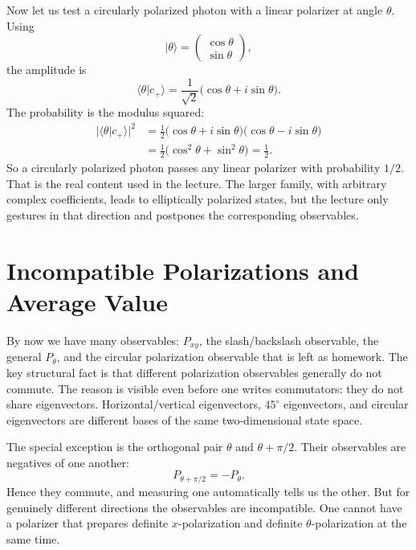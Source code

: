 Now let us test a circularly polarized photon with a linear polarizer at angle \(\theta\). Using
\begin{equation}
|\theta\rangle=
\begin{pmatrix}
\cos\theta\\
\sin\theta
\end{pmatrix},
\end{equation}
the amplitude is
\begin{equation}
\langle \theta|c_+\rangle
=
\frac{1}{\sqrt2}\bigl(\cos\theta+i\sin\theta\bigr).
\end{equation}
The probability is the modulus squared:
\begin{align}
|\langle \theta|c_+\rangle|^2
&=
\frac12\bigl(\cos\theta+i\sin\theta\bigr)\bigl(\cos\theta-i\sin\theta\bigr) \\
&=
\frac12\bigl(\cos^2\theta+\sin^2\theta\bigr)
=
\frac12.
\end{align}
So a circularly polarized photon passes any linear polarizer with probability \(1/2\). That is the real content used in the lecture. The larger family, with arbitrary complex coefficients, leads to elliptically polarized states, but the lecture only gestures in that direction and postpones the corresponding observables.

\section{Incompatible Polarizations and Average Value}

By now we have many observables: \(P_{xy}\), the slash/backslash observable, the general \(P_\theta\), and the circular polarization observable that is left as homework. The key structural fact is that different polarization observables generally do not commute. The reason is visible even before one writes commutators: they do not share eigenvectors. Horizontal/vertical eigenvectors, \(45^\circ\) eigenvectors, and circular eigenvectors are different bases of the same two-dimensional state space.

The special exception is the orthogonal pair \(\theta\) and \(\theta+\pi/2\). Their observables are negatives of one another:
\begin{equation}
P_{\theta+\pi/2}=-P_\theta.
\end{equation}
Hence they commute, and measuring one automatically tells us the other. But for genuinely different directions the observables are incompatible. One cannot have a polarizer that prepares definite \(x\)-polarization and definite \(\theta\)-polarization at the same time.

